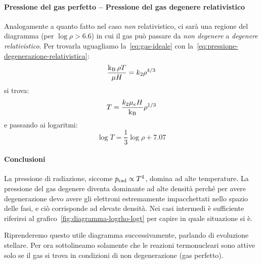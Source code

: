 \paragraph{Pressione del gas perfetto -- Pressione del gas degenere relativistico}
Analogamente a quanto fatto nel caso \emph{non} relativistico, ci sarà una regione del diagramma (per $\log \rho > 6.6$) in cui il gas può passare da \emph{non degenere} a \emph{degenere relativistico}. Per trovarla uguagliamo la~\eqref{eq:gas-ideale} con la~\eqref{eq:pressione-degenerazione-relativistica}:
\[
\frac{\operatorname{k_B} \rho T}{\mu H} = k_2 \rho^{4/3}
\]
si trova:
\[
T = \frac{k_2 \mu_e H}{\operatorname{k_B}} \rho^{1/3}
\]
e passando ai logaritmi:
\begin{equation}\label{eq:pgas-pdegrel}
    \log T = \frac{1}{3} \log \rho + 7.07
\end{equation}

\paragraph{Conclusioni}
La pressione di radiazione, siccome $p_\textup{rad} \propto T^4$, domina ad alte temperature. La pressione del gas degenere diventa dominante ad alte densità perché per avere degenerazione devo avere gli elettroni estremamente impacchettati nello spazio delle fasi, e ciò corrisponde ad elevate densità. Nei casi intermedi è sufficiente riferirsi al grafico~\ref{fig:diagramma-logrho-logt} per capire in quale situazione si è.

Riprenderemo questo utile diagramma successivamente, parlando di evoluzione stellare. Per ora sottolineamo solamente che le reazioni termonucleari sono attive solo se il gas si trova in condizioni di non degenerazione (gas perfetto).